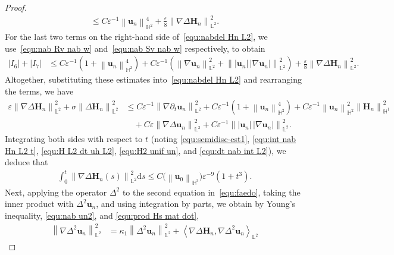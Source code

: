 \documentclass[11pt, reqno]{amsart}
\theoremstyle{definition}
\numberwithin{equation}{section}
\newcommand{\bff}{\boldsymbol}
\newcommand{\bb}{\mathbb}
\newcommand{\ds}{\mathrm{d}s}
\newcommand{\norm}[2]{\left\|{#1}\right\|_{#2}}
\newcommand{\inpro}[2]{\left\langle#1,#2\right\rangle}
\newcommand{\abs}[1]{\left|{#1}\right|}
\begin{document}
\begin{proof}
\begin{align*}
		\leq
		C \varepsilon^{-1} \norm{\bff{u}_n}{\bb{H}^2}^4 
		+
		\frac{\varepsilon}{8} \norm{\nabla\Delta \bff{H}_n}{\bb{L}^2}^2.
	\end{align*}
	For the last two terms on the right-hand side of~\eqref{equ:nabdel Hn L2}, we use~\eqref{equ:nab Rv nab w} and~\eqref{equ:nab Sv nab w} respectively, to obtain
	\begin{align*}
		\abs{I_6}+ \abs{I_7}
		&\leq
		C\varepsilon^{-1}
		\left( 1+\norm{\bff{u}_n}{\bb{H}^2}^4\right)
		+
		C\varepsilon^{-1} \left( \norm{\nabla \bff{u}_n}{\bb{L}^2}^2
		+
		\norm{|\bff{u}_n|\, |\nabla \bff{u}_n|}{\bb{L}^2}^2 \right)
		+
		\frac{\varepsilon}{8} \norm{\nabla\Delta \bff{H}_n}{\bb{L}^2}^2.
	\end{align*}
	Altogether, substituting these estimates into~\eqref{equ:nabdel Hn L2} and rearranging the terms, we have 
    \begin{align}\label{equ:varep Hn}
        \varepsilon \norm{\nabla\Delta \bff{H}_n}{\bb{L}^2}^2
        +
        \sigma\norm{\Delta \bff{H}_n}{\bb{L}^2}^2
        &\leq
        C\varepsilon^{-1} \norm{\nabla\partial_t \bff{u}_n}{\bb{L}^2}^2
        +
        C\varepsilon^{-1} \left(1+\norm{\bff{u}_n}{\bb{H}^2}^4\right)
        +
        C\varepsilon^{-1} \norm{\bff{u}_n}{\bb{H}^2}^2 \norm{\bff{H}_n}{\bb{H}^1}^2
        \nonumber\\
        &\quad
        +
        C\varepsilon \norm{\nabla \Delta\bff{u}_n}{\bb{L}^2}^2
        +
        C\varepsilon^{-1} \norm{|\bff{u}_n|\, |\nabla \bff{u}_n|}{\bb{L}^2}^2.
    \end{align}
    Integrating both sides with respect to $t$ (noting \eqref{equ:semidisc-est1}, \eqref{equ:int nab Hn L2 t}, \eqref{equ:H L2 dt uh L2}, \eqref{equ:H2 unif un}, and \eqref{equ:dt nab int L2}), we deduce that
	\begin{align}\label{equ:int nabdel Hn}
		\int_0^t \norm{\nabla\Delta \bff{H}_n(s)}{\bb{L}^2}^2 \ds
		\leq 
		C \big(\norm{\bff{u}_0}{\bb{H}^3}\big) \varepsilon^{-9} \left(1+t^3 \right).
	\end{align}
	Next, applying the operator $\Delta^2$ to the second equation in~\eqref{equ:faedo}, taking the inner product with $\Delta^2 \bff{u}_n$, and using integration by parts, we obtain by Young's inequality, \eqref{equ:nab un2}, and \eqref{equ:prod Hs mat dot},
    \begin{align}\label{equ:Delta22 un L2 2}
		\nonumber
		\norm{\nabla \Delta^2 \bff{u}_n}{\bb{L}^2}^2
		&=
		\kappa_1 \norm{\Delta^2 \bff{u}_n}{\bb{L}^2}^2
		+
		\inpro{\nabla\Delta\bff{H}_n}{\nabla\Delta^2 \bff{u}_n}_{\bb{L}^2}

\end{align}
\end{proof}
\end{document}
